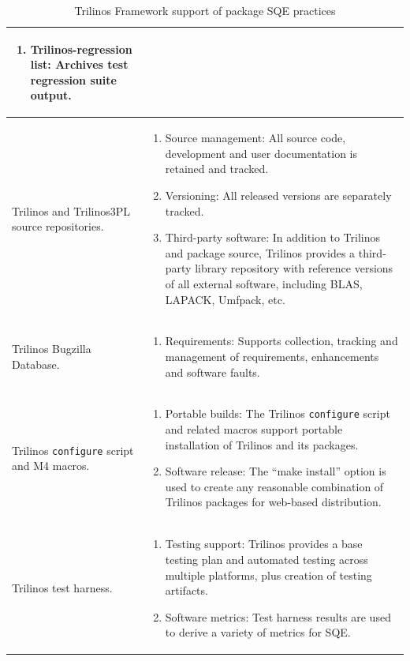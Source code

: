 \documentclass[acmtoms,acmnow]{acmtrans2m}
\begin{document}
\begin{table}
\begin{center}
\begin{tabular}{|p{1.75in}|p{2.75in}|}
\begin{enumerate}
a Trilinos release.
\item Trilinos-regression list: Archives test regression suite output.
\end{enumerate}\\\hline
Trilinos and Trilinos3PL source repositories. &
\begin{enumerate}
\item Source management:  All source code, development and user documentation is retained
and tracked.
\item Versioning: All released versions are separately tracked.
\item  Third-party software: In addition to Trilinos
and package source, Trilinos provides a third-party library repository
with reference versions of all external software, including BLAS,
LAPACK, Umfpack, etc.
\end{enumerate}\\\hline
Trilinos Bugzilla Database.&
\begin{enumerate}
\item Requirements:  Supports collection, tracking and management of requirements,
enhancements and software faults.
\end{enumerate}\\\hline
Trilinos {\tt configure} script and M4 macros. &
\begin{enumerate}
\item Portable builds: The Trilinos {\tt configure} script and related macros support
portable installation of Trilinos and its packages.
\item Software release: The ``make install'' option is used to
create any reasonable combination of Trilinos packages for web-based distribution.
\end{enumerate}\\\hline
Trilinos test harness. &
\begin{enumerate}
\item Testing support: Trilinos provides a base testing plan and 
automated testing across
multiple platforms, plus creation of testing artifacts.
\item Software metrics: Test harness results are used to derive a
variety of metrics for SQE.
\end{enumerate}\\\hline
\end{tabular}
\caption{\label{table:practices} Trilinos Framework support of package
SQE practices}
\end{center}
\end{table}
\end{document}
